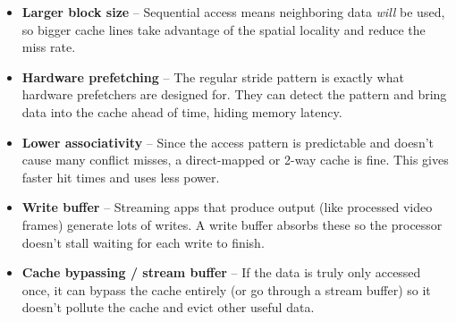 \documentclass[11pt]{article}
\begin{document}
\begin{itemize}[leftmargin=*]
  \item \textbf{Larger block size} -- Sequential access means neighboring data \textit{will} be used, so bigger cache lines take advantage of the spatial locality and reduce the miss rate.

  \item \textbf{Hardware prefetching} -- The regular stride pattern is exactly what hardware prefetchers are designed for. They can detect the pattern and bring data into the cache ahead of time, hiding memory latency.

  \item \textbf{Lower associativity} -- Since the access pattern is predictable and doesn't cause many conflict misses, a direct-mapped or 2-way cache is fine. This gives faster hit times and uses less power.

  \item \textbf{Write buffer} -- Streaming apps that produce output (like processed video frames) generate lots of writes. A write buffer absorbs these so the processor doesn't stall waiting for each write to finish.

  \item \textbf{Cache bypassing / stream buffer} -- If the data is truly only accessed once, it can bypass the cache entirely (or go through a stream buffer) so it doesn't pollute the cache and evict other useful data.
\end{itemize}
\end{document}
